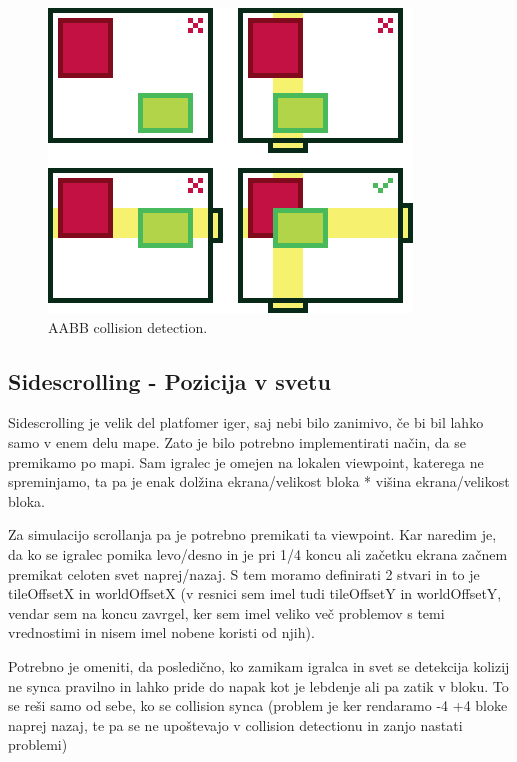 \documentclass[a4paper,11pt]{article}
\begin{document}
\begin{figure}[htbp]
	\begin{center}
		\includegraphics[scale=0.6]{overlap.png}
		\caption{AABB collision detection.}
		\label{zanri_slika}
	\end{center}
\end{figure}
\pagebreak

\subsection{Sidescrolling - Pozicija v svetu}

Sidescrolling je velik del platfomer iger, saj nebi bilo zanimivo, če bi bil lahko samo v enem delu mape. Zato je bilo potrebno implementirati način, da se premikamo po mapi. Sam igralec je omejen na lokalen viewpoint, katerega ne spreminjamo, ta pa je enak dolžina ekrana/velikost bloka * višina ekrana/velikost bloka.

Za simulacijo scrollanja pa je potrebno premikati ta viewpoint. Kar naredim je, da ko se igralec pomika levo/desno in je pri 1/4 koncu ali začetku ekrana začnem premikat celoten svet naprej/nazaj. S tem moramo definirati 2 stvari in to je tileOffsetX in worldOffsetX (v resnici sem imel tudi tileOffsetY in worldOffsetY, vendar sem na koncu zavrgel, ker sem imel veliko več problemov s temi vrednostimi in nisem imel nobene koristi od njih).

Potrebno je omeniti, da posledično, ko zamikam igralca in svet se detekcija kolizij ne synca pravilno in lahko pride do napak kot je lebdenje ali pa zatik v bloku. To se reši samo od sebe, ko se collision synca (problem je ker rendaramo -4 +4 bloke naprej nazaj, te pa se ne upoštevajo v collision detectionu in zanjo nastati problemi)
\end{document}
